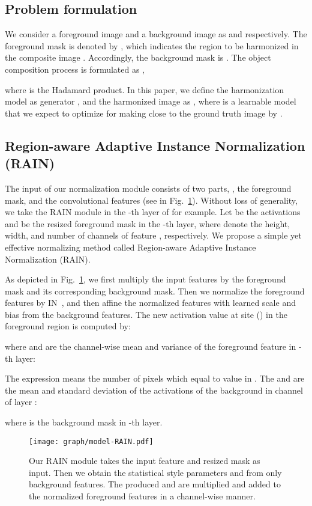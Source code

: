 \documentclass[final]{cvpr}
\begin{document}
\subsection{Problem formulation}
\label{subsec:problem_formulation}
We consider a foreground image and a background image as  and  respectively. The foreground mask is denoted by , which indicates the region to be harmonized in the composite image . Accordingly, the background mask is . The object composition process is formulated as , 

where  is the Hadamard product. In this paper, we define the harmonization model as generator , and the harmonized image as , where  is a learnable model that we expect to optimize for making  close to the ground truth image  by . 




\subsection{Region-aware Adaptive Instance Normalization (RAIN)}
\label{subsec:RAIN}
The input of our normalization module consists of two parts, \ie, the foreground mask, and the convolutional features (see in Fig.~\ref{fig:rain}). Without loss of generality, we take the RAIN module in the -th layer of  for example. Let  be the activations and  be the resized foreground mask in the -th layer, where  denote the height, width, and number of channels of feature , respectively. We propose a simple yet effective normalizing method called Region-aware Adaptive Instance Normalization (RAIN). 


As depicted in Fig.~\ref{fig:rain}, we first multiply the input features  by the foreground mask and its corresponding background mask. Then we normalize the foreground features by IN~\cite{ulyanov2016instance}, and then affine the normalized features with learned scale and bias from the background features. The new activation value  at site () in the foreground region is computed by:

where  and  are the channel-wise mean and variance of the foreground feature in -th layer:


The expression  means the number of pixels which equal to value  in . The  and  are the mean and standard deviation of the activations of the background in channel  of layer :


where  is the background mask in -th layer. 


\begin{figure}
\begin{center}
\texttt{[image: graph/model-RAIN.pdf]}
\end{center}
   \caption{Our RAIN module takes the input feature  and resized mask  as input. Then we obtain the statistical style parameters  and  from only background features. The produced  and  are multiplied and added to the normalized foreground features in a channel-wise manner. }
   \label{fig:rain}
\end{figure}
\end{document}
